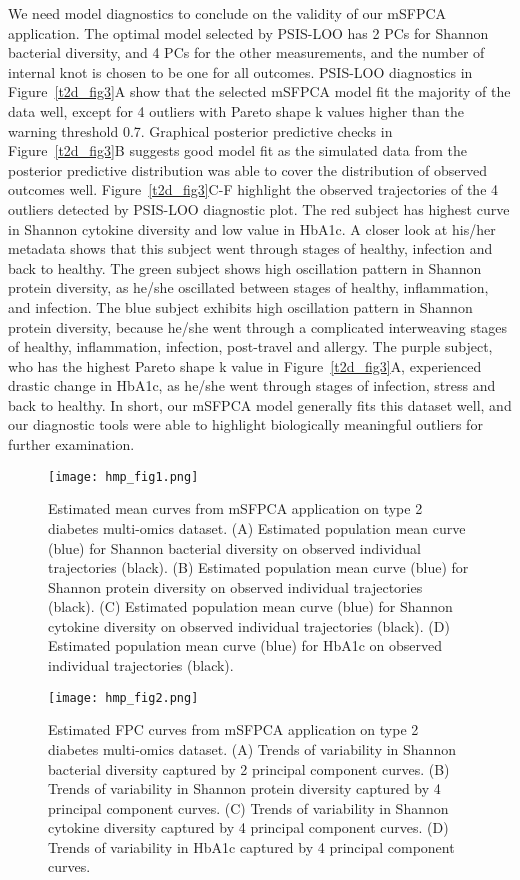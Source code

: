\documentclass[aoas,preprint]{imsart}
\begin{document}
We need model diagnostics to conclude on the validity of our mSFPCA application. The optimal model selected by PSIS-LOO has 2 PCs for Shannon bacterial diversity, and 4 PCs for the other measurements, and the number of internal knot is chosen to be one for all outcomes. PSIS-LOO diagnostics in Figure~\ref{t2d_fig3}A show that the selected mSFPCA model fit the majority of the data well, except for 4 outliers with Pareto shape k values higher than the warning threshold 0.7.  
Graphical posterior predictive checks in Figure~\ref{t2d_fig3}B suggests good model fit as the simulated data from the posterior predictive distribution was able to cover the distribution of observed outcomes well. Figure~\ref{t2d_fig3}C-F highlight the observed trajectories of the 4 outliers detected by PSIS-LOO diagnostic plot. The red subject has highest curve in Shannon cytokine diversity and low value in HbA1c. A closer look at his/her metadata shows that this subject went through stages of healthy, infection and back to healthy. The green subject shows high oscillation pattern in Shannon protein  diversity, as he/she oscillated between stages of healthy, inflammation, and infection. The blue subject exhibits high oscillation pattern in Shannon protein diversity, because he/she went through a complicated interweaving stages of healthy, inflammation, infection, post-travel and allergy. The purple subject, who has the highest Pareto shape k value in Figure~\ref{t2d_fig3}A, experienced drastic change in HbA1c, as he/she went through stages of infection, stress and back to healthy. In short, our mSFPCA model generally fits this dataset well, and our diagnostic tools were able to highlight biologically meaningful outliers for further examination. 

\begin{figure}
\texttt{[image: hmp\_fig1.png]}
\caption{Estimated mean curves from mSFPCA application on type 2 diabetes multi-omics dataset. (A) Estimated population mean curve (blue) for Shannon bacterial diversity on observed individual trajectories (black). (B) Estimated population mean curve (blue) for Shannon protein diversity on observed individual trajectories (black). (C) Estimated population mean curve (blue) for Shannon cytokine diversity on observed individual trajectories (black). (D) Estimated population mean curve (blue) for HbA1c on observed individual trajectories (black).}
\label{t2d_fig1}
\end{figure}

\begin{figure}
\texttt{[image: hmp\_fig2.png]}
\caption{Estimated FPC curves from mSFPCA application on type 2 diabetes multi-omics dataset. (A) Trends of variability in Shannon bacterial diversity captured by 2 principal component curves. (B) Trends of variability in Shannon protein diversity captured by 4 principal component curves. (C) Trends of variability in Shannon cytokine diversity captured by 4 principal component curves. (D) Trends of variability in HbA1c captured by 4 principal component curves.}
\label{t2d_fig2}
\end{figure}
\end{document}
